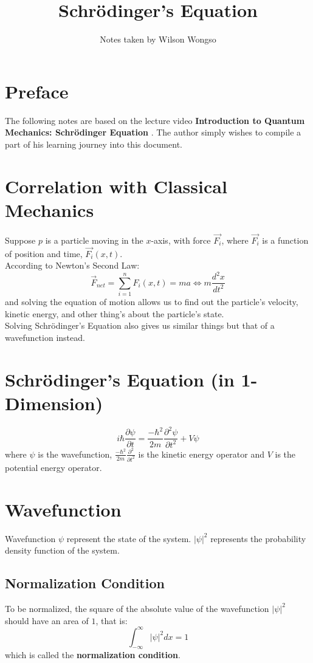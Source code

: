 \documentclass[hidelinks, a4paper, 12pt]{article}
\title{Schrödinger's Equation}
\author{Notes taken by Wilson Wongso}
\date{}
\newcommand{\biimp}{\Leftrightarrow}
\newcommand{\bd}{\textbf}
\newcommand{\n}{\\[\baselineskip]}
\begin{document}
    \maketitle
        
    \tableofcontents

    \section{Preface}
        The following notes are based on the lecture video \bd{Introduction to Quantum Mechanics: Schrödinger Equation} \cite{QM-Schrodinger}.
        The author simply wishes to compile a part of his learning journey into this document.

    \section{Correlation with Classical Mechanics}
        Suppose $p$ is a particle moving in the $x$-axis, with force $\vec{F_i}$, where $\vec{F_i}$ is a function of position and time, $\vec{F_i}(x,t)$.\n
        According to Newton's Second Law:
        \[\vec{F}_{net} = \sum_{i=1}^{n}F_i(x,t) = ma \biimp m\frac{d^2x}{dt^2}\]
        and solving the equation of motion allows us to find out the particle's velocity, kinetic energy, and other thing's about the particle's state.\n
        Solving Schrödinger's Equation also gives us similar things but that of a wavefunction instead.

    \section{Schrödinger's Equation (in 1-Dimension)}
        \[i\hbar \frac{\partial\psi}{\partial t} = \frac{-\hbar^2}{2m}\frac{\partial^2\psi}{\partial t^2}+V\psi\]
        where $\psi$ is the wavefunction, $\frac{-\hbar^2}{2m} \frac{\partial^2}{\partial t^2}$ is the kinetic energy operator and $V$ is the potential energy operator.

    \section{Wavefunction}
        Wavefunction $\psi$ represent the state of the system. $|\psi|^2$ represents the probability density function of the system.
        \subsection{Normalization Condition}
            To be normalized, the square of the absolute value of the wavefunction $|\psi|^2$ should have an area of $1$, that is:
            \[\int_{-\infty}^{\infty}|\psi|^2dx = 1\]
            which is called the \bd{normalization condition}.
\end{document}
